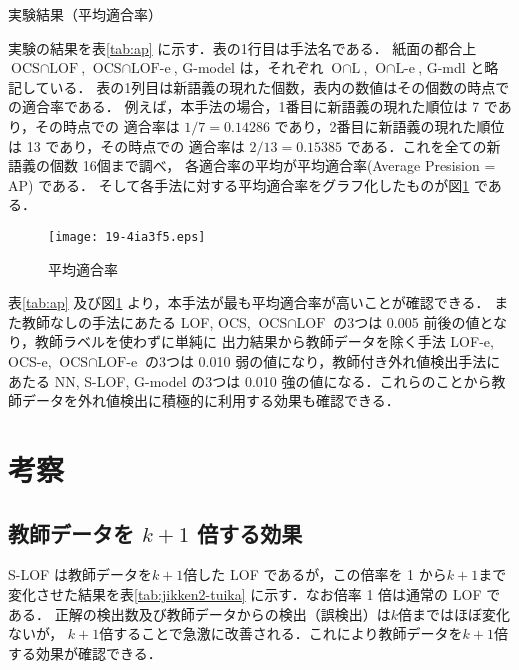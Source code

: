 \documentclass[japanese]{jnlp_1.4}
\begin{document}
\begin{table}[b]
\caption{実験結果（平均適合率）}
\label{tab:ap}

\end{table}

実験の結果を表\ref{tab:ap} に示す．表の1行目は手法名である．
紙面の都合上 $\text{OCS}\cap\text{LOF}$, $\text{OCS}\cap\text{LOF-e}$, G-model は，それぞれ
$\text{O}\cap\text{L}$, $\text{O}\cap\text{L-e}$, G-mdl と略記している．
表の1列目は新語義の現れた個数，表内の数値はその個数の時点での適合率である．
例えば，本手法の場合，1番目に新語義の現れた順位は 7 であり，その時点での
適合率は $1/7 = 0.14286$ であり，2番目に新語義の現れた順位は 13 であり，その時点での
適合率は $2/13 = 0.15385$ である．これを全ての新語義の個数 16個まで調べ，
各適合率の平均が平均適合率(Average Presision = AP) である．
そして各手法に対する平均適合率をグラフ化したものが図\ref{fig-ap} である．

\begin{figure}[t]
\begin{center}
\texttt{[image: 19-4ia3f5.eps]}
\end{center}
\caption{平均適合率}
\label{fig-ap}
\end{figure} 

表\ref{tab:ap} 及び図\ref{fig-ap} より，本手法が最も平均適合率が高いことが確認できる．
また教師なしの手法にあたる LOF, OCS, $\text{OCS}\cap\text{LOF}$
の3つは 0.005 前後の値となり，教師ラベルを使わずに単純に
出力結果から教師データを除く手法 LOF-e, OCS-e, $\text{OCS}\cap\text{LOF-e}$ の3つは
0.010 弱の値になり，教師付き外れ値検出手法にあたる NN, S-LOF, G-model の3つは
0.010 強の値になる．これらのことから教師データを外れ値検出に積極的に利用する効果も確認できる．



\section{考察}

\subsection{教師データを $k+1$ 倍する効果} 

S-LOF は教師データを\( k+1 \)倍した LOF であるが，この倍率を 1 から\( k+1 \)まで変化させた結果を表\ref{tab:jikken2-tuika} に示す．なお倍率 1 倍は通常の LOF である．
正解の検出数及び教師データからの検出（誤検出）は\( k \)倍まではほぼ変化ないが，
\( k+1 \)倍することで急激に改善される．これにより教師データを\( k+1 \)倍する効果が確認できる．
\end{document}

